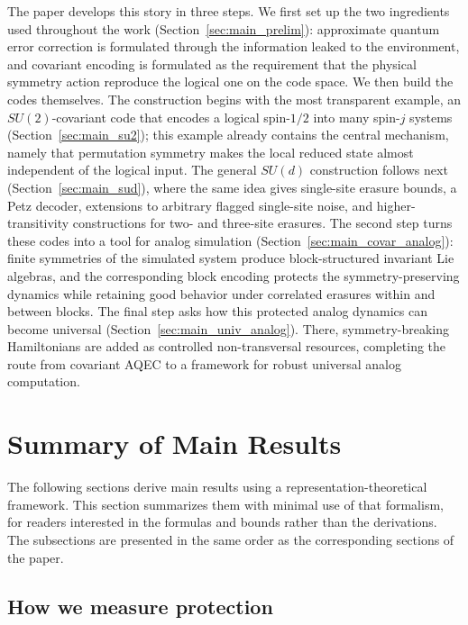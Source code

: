 \documentclass[10pt,twocolumn,superscriptaddress,aps,amsmath,amssymb,citeautoscript,floatfix,prx]{revtex4-2}
\newcounter{alg}
\theoremstyle{plain}
\theoremstyle{plain}
\theoremstyle{plain}
\theoremstyle{plain}
\theoremstyle{plain}
\theoremstyle{plain}
\begin{document}
The paper develops this story in three steps. We first set up the two ingredients used throughout the work (Section~\ref{sec:main_prelim}): approximate quantum error correction is formulated through the information leaked to the environment, and covariant encoding is formulated as the requirement that the physical symmetry action reproduce the logical one on the code space. We then build the codes themselves. The construction begins with the most transparent example, an $SU(2)$-covariant code that encodes a logical spin-$1/2$ into many spin-$j$ systems (Section~\ref{sec:main_su2}); this example already contains the central mechanism, namely that permutation symmetry makes the local reduced state almost independent of the logical input. The general $SU(d)$ construction follows next (Section~\ref{sec:main_sud}), where the same idea gives single-site erasure bounds, a Petz decoder, extensions to arbitrary flagged single-site noise, and higher-transitivity constructions for two- and three-site erasures. The second step turns these codes into a tool for analog simulation (Section~\ref{sec:main_covar_analog}): finite symmetries of the simulated system produce block-structured invariant Lie algebras, and the corresponding block encoding protects the symmetry-preserving dynamics while retaining good behavior under correlated erasures within and between blocks. The final step asks how this protected analog dynamics can become universal (Section~\ref{sec:main_univ_analog}). There, symmetry-breaking Hamiltonians are added as controlled non-transversal resources, completing the route from covariant AQEC to a framework for robust universal analog computation.

\section{Summary of Main Results}\label{sec:main_summary}
 
The following sections derive main results using a representation-theoretical framework. This section summarizes them with minimal use of that formalism, for readers interested in the formulas and bounds rather than the derivations. The subsections are presented in the same order as the corresponding sections of the paper.
 
\subsection{How we measure protection}\label{subsec:summary_framework}
 
\end{document}
